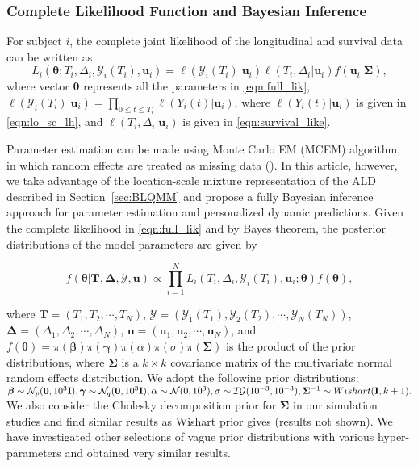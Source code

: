 \subsubsection{Complete Likelihood Function and Bayesian Inference}\label{sec:estimation}
For subject $i$, the complete joint likelihood of the longitudinal and survival data can be written as
\begin{equation}\label{eqn:full_lik}
L_i(\boldsymbol{\theta};T_i, \Delta_i, \mathcal{Y}_{i}(T_i), \boldsymbol{u}_i) = \ell(\mathcal{Y}_{i}(T_i)|\boldsymbol{u}_i)\ell(T_i, \Delta_i|\boldsymbol{u}_i)f(\boldsymbol{u}_i|\boldsymbol{\Sigma}),
\end{equation}
where vector $\boldsymbol{\theta}$ represents all the parameters in \eqref{eqn:full_lik},  $\ell(\mathcal{Y}_{i}(T_i)|\boldsymbol{u}_i)=\prod_{0\le t\le T_i}\ell(Y_{i}(t)|\boldsymbol{u}_i)$, where $\ell(Y_{i}(t)|\boldsymbol{u}_i)$ is given in \eqref{eqn:lo_sc_lh}, and $\ell(T_i, \Delta_i|\boldsymbol{u}_i)$ is given in \eqref{eqn:survival_like}.

Parameter estimation can be made using Monte Carlo EM (MCEM) algorithm, in which random effects are treated as missing data (\citealp{farcomeni2015longitudinal}). In this article, however, we take advantage of the location-scale mixture representation of the ALD described in Section~\ref{sec:BLQMM} and propose a fully Bayesian inference approach for parameter estimation and personalized dynamic predictions. Given the complete likelihood in \eqref{eqn:full_lik} and by Bayes theorem, the posterior distributions of the model parameters are given by

\begin{equation}\label{eqn:posterior}
f(\boldsymbol{\theta}|\boldsymbol{T}, \boldsymbol{\Delta}, \boldsymbol{\mathcal{Y}}, \boldsymbol{u})\propto \prod_{i=1}^N L_i(T_i, \Delta_i, \mathcal{Y}_{i}(T_i), \boldsymbol{u}_i;\boldsymbol{\theta}) f(\boldsymbol{\theta}),
\end{equation}

\noindent where $\boldsymbol{T}=(T_1, T_2, \cdots, T_N)$, $\boldsymbol{\mathcal{Y}}=(\mathcal{Y}_{1}(T_1), \mathcal{Y}_{2}(T_2), \cdots, \mathcal{Y}_{N}(T_N))$, $\boldsymbol{\Delta} =(\Delta_1, \Delta_2, \cdots, \Delta_N)$, $\boldsymbol{u}=(\boldsymbol{u}_1, \boldsymbol{u}_2, \cdots, \boldsymbol{u}_N)$, and $f(\boldsymbol{\theta})=\pi(\boldsymbol{\beta})\pi(\boldsymbol{\gamma})\pi(\alpha)\pi(\sigma)\pi(\boldsymbol{\Sigma})$ is the product of the prior distributions,
where $\boldsymbol{\Sigma}$ is a $k\times k$ covariance matrix of the multivariate normal random effects distribution. We adopt the following prior distributions:
$\boldsymbol{\beta} \sim \mathcal{N}_p({\boldsymbol 0}, 10^3{\bf I}), \boldsymbol{\gamma} \sim \mathcal{N}_q({\boldsymbol 0}, 10^3{\bf I}), \alpha\sim \mathcal{N}(0, 10^3), \sigma\sim \mathcal{IG}(10^{-3}, 10^{-3}), \boldsymbol{\Sigma}^{-1}\sim Wishart({\bf I}, k+1).$ We also consider the Cholesky decomposition prior for $\boldsymbol{\Sigma}$ in our simulation studies and find similar results as Wishart prior gives (results not shown). We have investigated other selections of vague prior distributions with various hyper-parameters and obtained very similar results.

